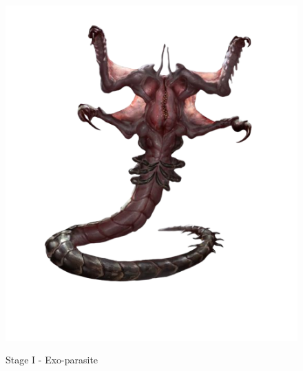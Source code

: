 \begin{figure}
    \centering
    \includegraphics[width=.45\textwidth]{img/stage-I-bg.png}
    \label{fig:stage-1}
    \caption*{Stage I - Exo-parasite}
\end{figure}
